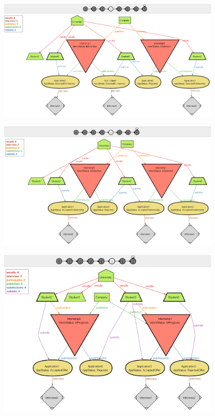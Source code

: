\begin{figure}
    \centering
    \includegraphics[width=1\textwidth]{Images/Alloy/dyn4.png}\label{fig:dyn4}
\end{figure}
\begin{figure}
    \centering
    \includegraphics[width=1\textwidth]{Images/Alloy/dyn5.png}\label{fig:dyn5}
\end{figure}
\begin{figure}
    \centering
    \includegraphics[width=1\textwidth]{Images/Alloy/dyn6.png}\label{fig:dyn6}
\end{figure}

